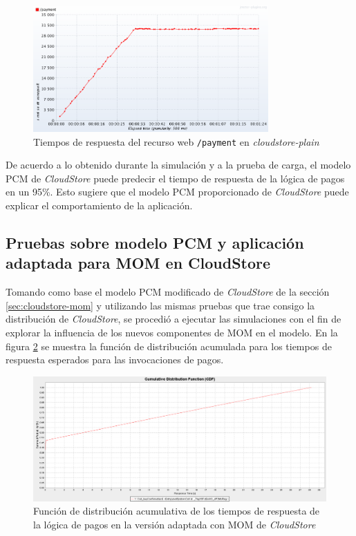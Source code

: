 \documentclass[conference]{IEEEtran}
\begin{document}
\begin{figure}[h]
  \centering
  \includegraphics[width=9cm]{cloudstore-plain-aws-1}
  \caption{\small{Tiempos de respuesta del recurso web \texttt{/payment} en \emph{cloudstore-plain}}}
  \label{fig:cloudstore-jmeter-plain-1}
\end{figure}

De acuerdo a lo obtenido durante la simulación y a la prueba de carga, el modelo PCM de \emph{CloudStore} puede predecir el tiempo de respuesta de la lógica de pagos en un 95\%. Esto sugiere que el modelo PCM proporcionado de \emph{CloudStore} puede explicar el comportamiento de la aplicación.

\subsection{Pruebas sobre modelo PCM y aplicación adaptada para MOM en CloudStore}
Tomando como base el modelo PCM modificado de \emph{CloudStore} de la sección \ref{sec:cloudstore-mom} y utilizando las mismas pruebas que trae consigo la distribución de \emph{CloudStore}, se procedió a ejecutar las simulaciones con el fin de explorar la influencia de los nuevos componentes de MOM en el modelo. En la figura \ref{fig:cloudstore-pcm-jms-1} se muestra la función de distribución acumulada para los tiempos de respuesta esperados para las invocaciones de pagos.

\begin{figure}[h]
  \centering
  \includegraphics[width=17cm]{cloudstore-palladio-jms-cdf-1.png}
  \caption{\small{Función de distribución acumulativa de los tiempos de respuesta de la lógica de pagos en la versión adaptada con MOM de \emph{CloudStore}}}
  \label{fig:cloudstore-pcm-jms-1}
\end{figure}
\end{document}
